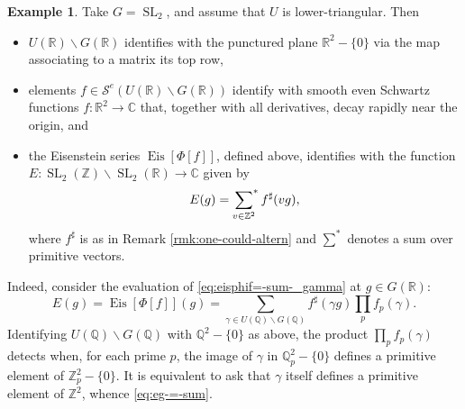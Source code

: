 \documentclass[reqno]{amsart}
\DeclareMathOperator{\SL}{SL}
\DeclareMathOperator{\Eis}{Eis}
\theoremstyle{plain} \newtheorem{theorem} {Theorem}
\theoremstyle{definition} \newtheorem{definition} [theorem] {Definition}
\newtheorem{example} [theorem] {Example}
\theoremstyle{itplain} %
\numberwithin{equation}{section}
\numberwithin{theorem}{section}
\begin{document}
\begin{example}\label{exa:example-sl2-completed-eisenstein-series}
  Take  $G = \SL_2$, and assume that $U$ is lower-triangular.  Then
  \begin{itemize}
  \item $U(\mathbb{R}) \backslash G(\mathbb{R})$ identifies with the punctured plane $\mathbb{R}^2 - \{0\}$ via the map associating to a matrix its top row,
  \item elements $f \in \mathcal{S}^e(U(\mathbb{R}) \backslash G(\mathbb{R}))$ identify with smooth even Schwartz functions $f : \mathbb{R}^2 \rightarrow \mathbb{C}$ that, together with all derivatives, decay rapidly near the origin, and
  \item the Eisenstein series $\Eis[\Phi[f]]$, defined above, identifies with the function $E : \SL_2(\mathbb{Z}) \backslash \SL_2(\mathbb{R}) \rightarrow \mathbb{C}$ given by
    \begin{equation}\label{eq:eg-=-sum}
      E(g) = \sideset{}{^*}\sum _{v \in \mathbb{Z}^2} f ^\sharp( v g),
    \end{equation}
    where $f ^\sharp$ is as in Remark \ref{rmk:one-could-altern} and $\sum^*$ denotes a sum over primitive vectors.
  \end{itemize}
  Indeed, consider the evaluation of \eqref{eq:eisphif=-sum-_gamma} at $g \in G(\mathbb{R})$:
  \begin{equation*}
    E(g) = \Eis[\Phi[f]](g) = \sum _{\gamma \in U(\mathbb{Q}) \backslash G(\mathbb{Q})} f ^\sharp (\gamma g) \prod_p f_p(\gamma).
  \end{equation*}
  Identifying $U(\mathbb{Q}) \backslash G(\mathbb{Q})$ with $\mathbb{Q}^2 - \{0\}$ as above, the product $\prod_p f_p(\gamma)$ detects when, for each prime $p$, the image of $\gamma$ in $\mathbb{Q}_p^2 - \{0\}$ defines a primitive element of $\mathbb{Z}_p^2 - \{0\}$.  It is equivalent to ask that $\gamma$ itself defines a primitive element of $\mathbb{Z}^2$, whence \eqref{eq:eg-=-sum}.


\end{example}
\end{document}
